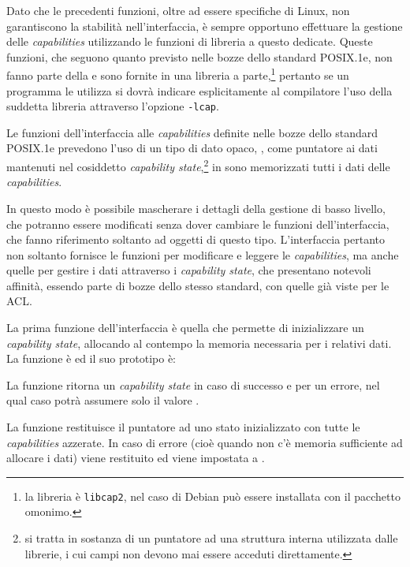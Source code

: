 Dato che le precedenti funzioni, oltre ad essere specifiche di Linux, non
garantiscono la stabilità nell'interfaccia, è sempre opportuno effettuare la
gestione delle \textit{capabilities} utilizzando le funzioni di libreria a
questo dedicate. Queste funzioni, che seguono quanto previsto nelle bozze
dello standard POSIX.1e, non fanno parte della  e sono fornite in
una libreria a parte,\footnote{la libreria è \texttt{libcap2}, nel caso di
  Debian può essere installata con il pacchetto omonimo.} pertanto se un
programma le utilizza si dovrà indicare esplicitamente al compilatore l'uso
della suddetta libreria attraverso l'opzione \texttt{-lcap}.


Le funzioni dell'interfaccia alle \textit{capabilities} definite nelle bozze
dello standard POSIX.1e prevedono l'uso di un tipo di dato opaco,
, come puntatore ai dati mantenuti nel cosiddetto
\textit{capability state},\footnote{si tratta in sostanza di un puntatore ad
  una struttura interna utilizzata dalle librerie, i cui campi non devono mai
  essere acceduti direttamente.} in sono memorizzati tutti i dati delle
\textit{capabilities}.

In questo modo è possibile mascherare i dettagli della gestione di basso
livello, che potranno essere modificati senza dover cambiare le funzioni
dell'interfaccia, che fanno riferimento soltanto ad oggetti di questo tipo.
L'interfaccia pertanto non soltanto fornisce le funzioni per modificare e
leggere le \textit{capabilities}, ma anche quelle per gestire i dati
attraverso i \textit{capability state}, che presentano notevoli affinità,
essendo parte di bozze dello stesso standard, con quelle già viste per le ACL.

La prima funzione dell'interfaccia è quella che permette di inizializzare un
\textit{capability state}, allocando al contempo la memoria necessaria per i
relativi dati. La funzione è  ed il suo prototipo è:

\begin{funcproto}{
}

{La funzione ritorna un \textit{capability state} in caso di successo e
   per un errore, nel qual caso  potrà assumere solo il
  valore .  }
\end{funcproto}

La funzione restituisce il puntatore  ad uno stato inizializzato
con tutte le \textit{capabilities} azzerate. In caso di errore (cioè quando
non c'è memoria sufficiente ad allocare i dati) viene restituito 
ed  viene impostata a .  

